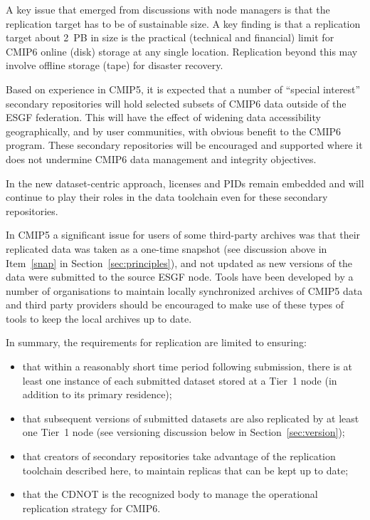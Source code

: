 \documentclass[gmd,manuscript]{copernicus}
\newcommand{\pllabel}[1]{\label{p-#1}\linelabel{l-#1}}
\begin{document}
A key issue that emerged from discussions with node managers is that
the replication target has to be of sustainable size. A key finding is
that a replication target about 2~PB in size is the practical
(technical and financial) limit for CMIP6 online (disk) storage at any
single location. Replication beyond this may involve offline storage
(tape) for disaster recovery.

Based on experience in CMIP5, it is expected that a number of
``special interest'' secondary repositories will hold selected subsets
of CMIP6 data outside of the ESGF federation. This will have the
effect of widening data accessibility geographically, and by user
communities, with obvious benefit to the CMIP6 program. These
secondary repositories will be encouraged and supported where it does
not undermine CMIP6 data management and integrity objectives.

\pllabel{RC1-62}
In the new dataset-centric approach, licenses and PIDs remain embedded
and will continue to play their roles in the data toolchain even for
these secondary repositories.

In CMIP5 a significant issue for users of some third-party archives
was that their replicated data was taken as a one-time snapshot (see
discussion above in Item~\ref{snap} in Section~\ref{sec:principles}),
and not updated as new versions of the data were submitted to the
source ESGF node. Tools have been developed by a number of
organisations to maintain locally synchronized archives of CMIP5 data
and third party providers should be encouraged to make use of these
types of tools to keep the local archives up to date.

In summary, the requirements for replication are limited to ensuring:

\begin{itemize}
\item that within a reasonably short time period following submission,
there is at least one instance of each submitted dataset
  stored at a Tier~1 node (in addition to its primary residence);
\item that subsequent versions of submitted datasets are also
  replicated by at least one Tier~1 node (see versioning discussion
  below in Section~\ref{sec:version});
\item that creators of secondary repositories take advantage of the
  replication toolchain described here, to maintain replicas that can
  be kept up to date;
\item that the CDNOT is the recognized body to manage the operational
  replication strategy for CMIP6.
\end{itemize}
\end{document}

